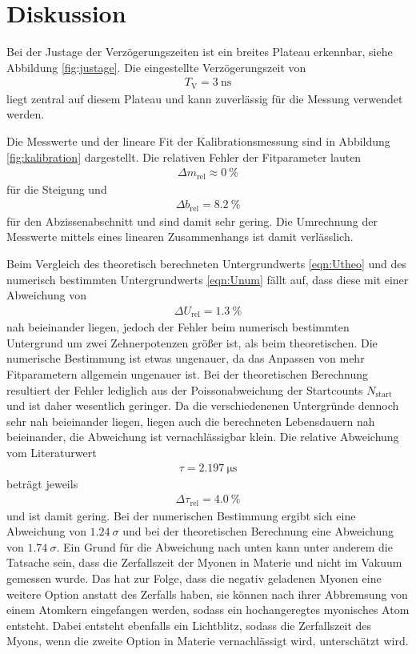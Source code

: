 \section{Diskussion}
\label{sec:Diskussion}

Bei der Justage der Verzögerungszeiten ist ein breites Plateau erkennbar, siehe Abbildung \ref{fig:justage}.
Die eingestellte Verzögerungszeit von
\begin{align*}
   T_\text{V} = \SI{3}{\nano\second}
\end{align*}
liegt zentral auf diesem Plateau und kann zuverlässig für die Messung verwendet werden.

Die Messwerte und der lineare Fit der Kalibrationsmessung sind in Abbildung \ref{fig:kalibration} dargestellt.
Die relativen Fehler der Fitparameter lauten
\begin{align}
  \Delta m_\text{rel} \approx \SI{0}{\percent}
\end{align}
für die Steigung und
\begin{align}
  \Delta b_\text{rel} = \SI{8.2}{\percent}
\end{align}
für den Abzissenabschnitt und sind damit sehr gering. Die Umrechnung der Messwerte mittels eines linearen Zusammenhangs ist
damit verlässlich.

Beim Vergleich des theoretisch berechneten Untergrundwerts \eqref{eqn:Utheo} und des numerisch bestimmten
Untergrundwerts \eqref{eqn:Unum} fällt auf, dass diese mit einer Abweichung von
\begin{align}
  \Delta U_\text{rel} = \SI{1.3}{\percent}
\end{align}
nah beieinander liegen, jedoch der Fehler beim numerisch bestimmten Untergrund um zwei Zehnerpotenzen größer ist,
als beim theoretischen. Die numerische Bestimmung ist etwas ungenauer, da das Anpassen von mehr Fitparametern
allgemein ungenauer ist. Bei der theoretischen Berechnung resultiert der Fehler lediglich aus der Poissonabweichung der
Startcounts $N_\text{start}$ und ist daher wesentlich geringer.
Da die verschiedenenen Untergründe dennoch sehr nah beieinander liegen, liegen auch die berechneten Lebensdauern nah beieinander,
die Abweichung ist vernachlässigbar klein. Die relative Abweichung vom Literaturwert \cite{pdg}
\begin{align}
  \tau = \SI{2.197}{\micro\second}
\end{align}
beträgt jeweils
\begin{align}
  \Delta \tau_\text{rel} = \SI{4.0}{\percent}
\end{align}
und ist damit gering. Bei der numerischen Bestimmung ergibt sich eine Abweichung von $\SI{1.24}{\sigma}$ und bei der 
theoretischen Berechnung eine Abweichung von $\SI{1.74}{\sigma}$.
Ein Grund für die Abweichung nach unten kann unter anderem die Tatsache sein, dass die
Zerfallszeit der Myonen in Materie und nicht im Vakuum gemessen wurde. Das hat zur Folge, dass die negativ geladenen
Myonen eine weitere Option anstatt des Zerfalls haben, sie können nach ihrer Abbremsung von einem Atomkern eingefangen
werden, sodass ein hochangeregtes myonisches Atom entsteht. Dabei entsteht ebenfalls ein Lichtblitz, sodass die Zerfallszeit
des Myons, wenn die zweite Option in Materie vernachlässigt wird, unterschätzt wird.

